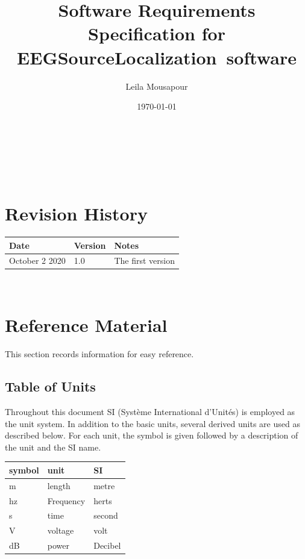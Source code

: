 \documentclass[12pt]{article}
\renewcommand{\progname}{EEGSourceLocalization}
\begin{document}
\title{Software Requirements Specification for \progname \ software} 
\author{Leila Mousapour}
\date{\today}
	
\maketitle

~\newpage


\tableofcontents



~\newpage

\section*{Revision History}

\begin{tabularx}{\textwidth}{p{3cm}p{2cm}X}
\toprule {\bf Date} & {\bf Version} & {\bf Notes}\\
\midrule
October 2  2020 & 1.0 & The first version\\
\bottomrule
\end{tabularx}

~\newpage

\section{Reference Material}

This section records information for easy reference.

\subsection{Table of Units}

Throughout this document SI (Syst\`{e}me International d'Unit\'{e}s) is employed
as the unit system.  In addition to the basic units, several derived units are
used as described below.  For each unit, the symbol is given followed by a
description of the unit and the SI name.
~\newline

\renewcommand{\arraystretch}{1.2}
  \noindent \begin{tabular}{l l l} 
    \toprule		
    \textbf{symbol} & \textbf{unit} & \textbf{SI}\\
    \midrule 
    \si{\metre} & length & metre\\
    hz & Frequency	& herts\\
    \si{\second} & time & second\\
    \si{\volt} & voltage & volt\\
    \si{\dB} & power & Decibel \\
    \bottomrule
  \end{tabular}
\end{document}
